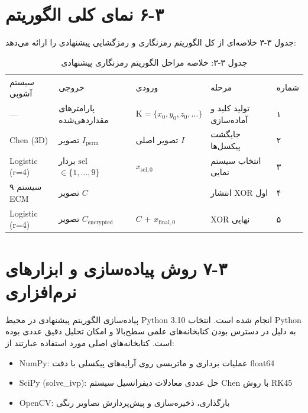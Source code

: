 \section{‏۳‏-‏۶‏ نمای کلی الگوریتم}

جدول ۳-۳ خلاصه‌ای از کل الگوریتم رمزنگاری و رمزگشایی پیشنهادی را ارائه می‌دهد:

\begin{table}[h]
\centering
\small
\begin{tabular}{lllll}
\hline
سیستم آشوبی & خروجی & ورودی & مرحله & شماره \\
--- & پارامترهای مقداردهی‌شده & $\mathrm{K} = \{x_0, y_0, z_0, \ldots\}$ & تولید کلید و آماده‌سازی & ۱ \\
Chen (3D) & تصویر $I_{\mathrm{perm}}$ & تصویر اصلی $I$ & جایگشت پیکسل‌ها & ۲ \\
Logistic (r=4) & بردار $\mathrm{sel}$\cite{ref1} $\in \{1,\ldots,9\}$ & $x_{\mathrm{sel},0}$ & انتخاب سیستم نمایی & ۳ \\
۹ سیستم  ECM & تصویر $C$ &  & انتشار XOR اول & ۴ \\
Logistic (r=4) & تصویر $C_{\mathrm{encrypted}}$ & $C$ + $x_{\mathrm{final},0}$ & XOR نهایی & ۵ \\
\hline
\end{tabular}
\caption{جدول ‏۳‏-‏۳‏: خلاصه مراحل الگوریتم رمزنگاری پیشنهادی}
\end{table}

\section{‏۳‏-‏۷‏ روش پیاده‌سازی و ابزارهای نرم‌افزاری}

پیاده‌سازی الگوریتم پیشنهادی در محیط Python 3.10{} انجام شده است. انتخاب Python به دلیل در دسترس بودن کتابخانه‌های علمی سطح‌بالا و امکان تحلیل دقیق عددی بوده است. کتابخانه‌های اصلی مورد استفاده عبارتند از:

\begin{itemize}
    \item NumPy:  عملیات برداری و ماتریسی روی آرایه‌های پیکسلی با دقت  float64
\end{itemize}

\begin{itemize}
    \item SciPy (solve\_ivp):  حل عددی معادلات دیفرانسیل سیستم Chen با روش RK45
\end{itemize}

\begin{itemize}
    \item OpenCV:  بارگذاری، ذخیره‌سازی و پیش‌پردازش تصاویر رنگی
\end{itemize}


